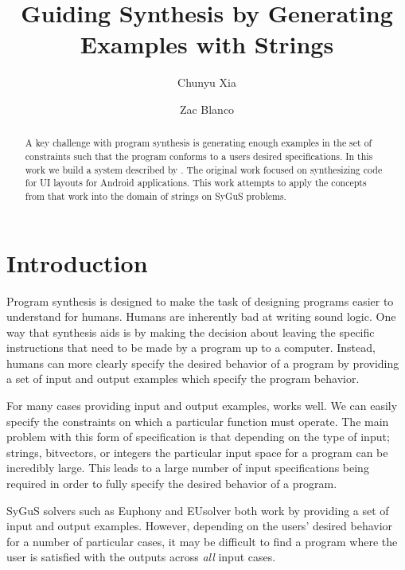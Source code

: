 \documentclass[sigconf,authordraft]{acmart}
\begin{document}
\title{Guiding Synthesis by Generating Examples with Strings}

\author{Chunyu Xia}

\author{Zac Blanco}

\begin{abstract}

A key challenge with program synthesis is generating enough examples in the set
of constraints such that the program conforms to a users desired specifications.
In this work we build a system described by \cite{laich2020guiding}. The
original work focused on synthesizing code for UI layouts for Android
applications. This work attempts to apply the concepts from that work into the
domain of strings on SyGuS problems.

\end{abstract}

\maketitle

\section{Introduction}

Program synthesis is designed to make the task of designing programs easier to
understand for humans. Humans are inherently bad at writing sound logic. One way
that synthesis aids is by making the decision about leaving the specific
instructions that need to be made by a program up to a computer. Instead, humans
can more clearly specify the desired behavior of a program by providing a set of
input and output examples which specify the program behavior.

For many cases providing input and output examples, works well. We can easily
specify the constraints on which a particular function must operate. The main
problem with this form of specification is that depending on the type of input;
strings, bitvectors, or integers the particular input space for a program can be
incredibly large. This leads to a large number of input specifications being
required in order to fully specify the desired behavior of a program.

SyGuS solvers such as Euphony \cite{lee2018accelerating} and EUsolver
\cite{alur2017scaling} both work by providing a set of input and output
examples. However, depending on the users' desired behavior for a number of
particular cases, it may be difficult to find a program where the user is
satisfied with the outputs across \textit{all} input cases.
\end{document}
